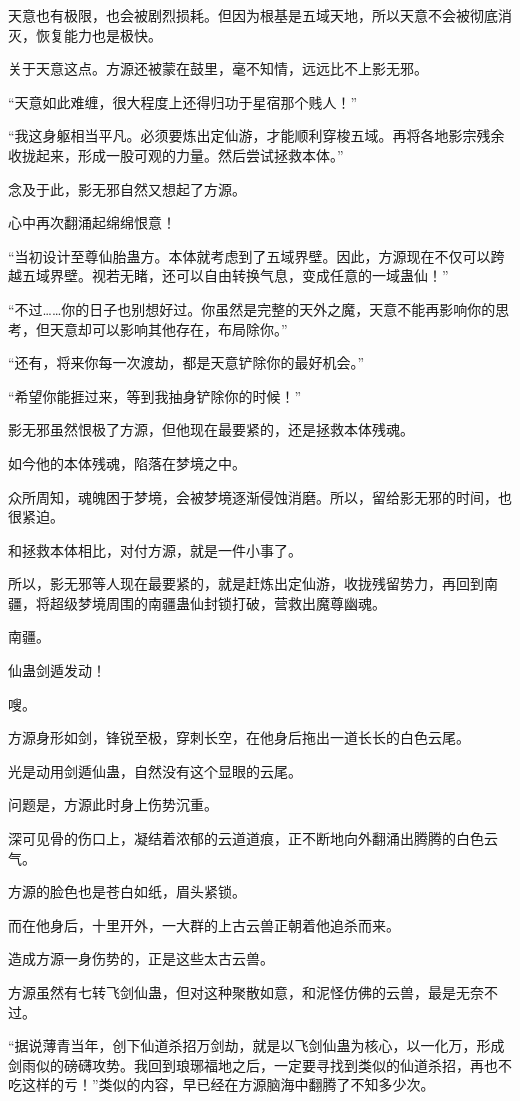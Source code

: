 \begin{this_body}
天意也有极限，也会被剧烈损耗。但因为根基是五域天地，所以天意不会被彻底消灭，恢复能力也是极快。

关于天意这点。方源还被蒙在鼓里，毫不知情，远远比不上影无邪。

“天意如此难缠，很大程度上还得归功于星宿那个贱人！”

“我这身躯相当平凡。必须要炼出定仙游，才能顺利穿梭五域。再将各地影宗残余收拢起来，形成一股可观的力量。然后尝试拯救本体。”

念及于此，影无邪自然又想起了方源。

心中再次翻涌起绵绵恨意！

“当初设计至尊仙胎蛊方。本体就考虑到了五域界壁。因此，方源现在不仅可以跨越五域界壁。视若无睹，还可以自由转换气息，变成任意的一域蛊仙！”

“不过……你的日子也别想好过。你虽然是完整的天外之魔，天意不能再影响你的思考，但天意却可以影响其他存在，布局除你。”

“还有，将来你每一次渡劫，都是天意铲除你的最好机会。”

“希望你能捱过来，等到我抽身铲除你的时候！”

影无邪虽然恨极了方源，但他现在最要紧的，还是拯救本体残魂。

如今他的本体残魂，陷落在梦境之中。

众所周知，魂魄困于梦境，会被梦境逐渐侵蚀消磨。所以，留给影无邪的时间，也很紧迫。

和拯救本体相比，对付方源，就是一件小事了。

所以，影无邪等人现在最要紧的，就是赶炼出定仙游，收拢残留势力，再回到南疆，将超级梦境周围的南疆蛊仙封锁打破，营救出魔尊幽魂。

南疆。

仙蛊剑遁发动！

嗖。

方源身形如剑，锋锐至极，穿刺长空，在他身后拖出一道长长的白色云尾。

光是动用剑遁仙蛊，自然没有这个显眼的云尾。

问题是，方源此时身上伤势沉重。

深可见骨的伤口上，凝结着浓郁的云道道痕，正不断地向外翻涌出腾腾的白色云气。

方源的脸色也是苍白如纸，眉头紧锁。

而在他身后，十里开外，一大群的上古云兽正朝着他追杀而来。

造成方源一身伤势的，正是这些太古云兽。

方源虽然有七转飞剑仙蛊，但对这种聚散如意，和泥怪仿佛的云兽，最是无奈不过。

“据说薄青当年，创下仙道杀招万剑劫，就是以飞剑仙蛊为核心，以一化万，形成剑雨似的磅礴攻势。我回到琅琊福地之后，一定要寻找到类似的仙道杀招，再也不吃这样的亏！”类似的内容，早已经在方源脑海中翻腾了不知多少次。


\end{this_body}
